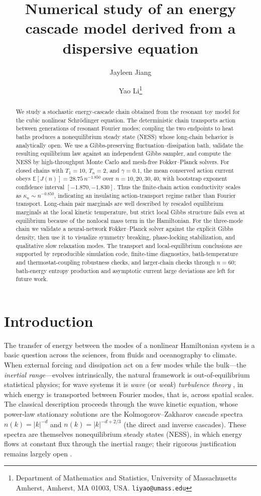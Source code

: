 \documentclass[11pt,a4paper]{article}
\title{Numerical study of an energy cascade model derived from a dispersive equation}
\author{Jayleen Jiang \and Yao Li\thanks{Department of Mathematics and Statistics, University of Massachusetts Amherst, Amherst, MA 01003, USA. \texttt{liyao@umass.edu}}}
\date{}
\theoremstyle{definition}
\newcommand{\E}{\mathbb{E}}
\numberwithin{equation}{section}   %
\begin{document}
\maketitle

\begin{abstract}
We study a stochastic energy-cascade chain obtained from the resonant toy model
for the cubic nonlinear Schr\"odinger equation. The deterministic chain
transports action between generations of resonant Fourier modes; coupling the
two endpoints to heat baths produces a nonequilibrium steady state (NESS) whose
long-chain behavior is analytically open. We use a Gibbs-preserving
fluctuation--dissipation bath, validate the resulting equilibrium law against
an independent Gibbs sampler, and compute the NESS by high-throughput Monte
Carlo and mesh-free Fokker--Planck solvers. For closed chains with
$T_1=10$, $T_n=2$, and $\gamma=0.1$, the mean conserved action current obeys
$\E[J(n)]=28.75\,n^{-1.850}$ over $n=10,20,30,40$, with bootstrap exponent
confidence interval $[-1.870,-1.830]$. Thus the finite-chain action
conductivity scales as $\kappa_n\sim n^{-0.850}$, indicating an insulating
action-transport regime rather than Fourier transport. Long-chain pair
marginals are well described by rescaled equilibrium marginals at the local
kinetic temperature, but strict local Gibbs structure fails even at
equilibrium because of the nonlocal mass term in the Hamiltonian. For the
three-mode chain we validate a neural-network Fokker--Planck solver against the
explicit Gibbs density, then use it to visualize symmetry breaking,
phase-locking stabilization, and qualitative slow relaxation modes. The
transport and local-equilibrium conclusions are supported by reproducible
simulation code, finite-time diagnostics, bath-temperature and
thermostat-coupling robustness checks, and larger-chain checks through $n=60$;
bath-energy entropy production and asymptotic current large deviations are
left for future work.
\end{abstract}


\section{Introduction}

The transfer of energy between the modes of a nonlinear Hamiltonian system is a
basic question across the sciences, from fluids and oceanography to climate.
When external forcing and dissipation act on a few modes while the bulk---the
\emph{inertial range}---evolves intrinsically, the natural framework is
out-of-equilibrium statistical physics; for wave systems it is \emph{wave} (or
\emph{weak}) \emph{turbulence theory} \cite{Nazarenko}, in which energy is
transported between Fourier modes, that is, across spatial scales. The classical
description proceeds through the wave kinetic equation, whose power-law
stationary solutions are the Kolmogorov--Zakharov cascade spectra
$n(k)=|k|^{-d}$ and $n(k)=|k|^{-d+2/3}$ (the direct and inverse cascades). These
spectra are themselves nonequilibrium steady states (NESS), in which energy
flows at constant flux through the inertial range; their rigorous justification
remains largely open \cite{HLNS}.
\end{document}
